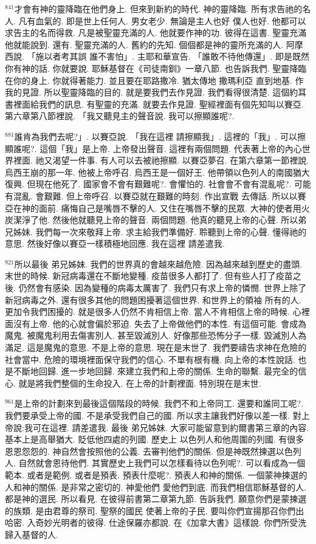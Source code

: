 \documentclass{book}
\begin{document}
$^{841}$才會有神的靈降臨在他們身上.
但來到新約的時代.
神的靈降臨.
所有求告祂的名人.
凡有血氣的.
即是世上任何人.
男女老少.
無論是主人也好 僕人也好.
他都可以求告主的名而得救.
凡是被聖靈充滿的人.
他就要作神的功.
彼得在這書.
聖靈充滿他就能說到.
還有.
聖靈充滿的人.
舊約的先知.
個個都是神的靈所充滿的人.
阿摩西說.
「施以者考其誤 誰不害怕」.
主耶和華宣告.
「誰敢不待他傳還」.
即是既然你有神的話.
你就要說.
耶穌基督在《司徒南釧》一章八節.
也告訴我們.
聖靈降臨在你的身上.
你就得著能力.
並且要在耶路撒冷.
猶太傳地 撒瑪利亞 直到地基.
作我的見證.
所以聖靈降臨的目的.
就是要我們去作見證.
我們看得很清楚.
這個約耳書裡面給我們的訊息.
有聖靈的充滿.
就要去作見證.
聖經裡面有個先知叫以賽亞.
第六章第八節裡說.
「我又聽見主的聲音說.
我可以擦顯誰呢?.

$^{881}$誰肯為我們去呢?」.
以賽亞說.
「我在這裡 請擦顯我」.
這裡的「我」.
可以擦顯誰呢?.
這個「我」是上帝.
上帝發出聲音.
這裡有兩個問題.
代表著上帝的內心世界裡面.
祂又渴望一件事.
有人可以去被祂擦顯.
以賽亞夢召.
在第六章第一節裡說.
烏西王崩的那一年.
他被上帝呼召.
烏西王是一個好王.
他帶領以色列人的南國猶大復興.
但現在他死了.
國家會不會有艱難呢?.
會懼怕的.
社會會不會有混亂呢?.
可能有混亂.
會艱難.
但上帝呼召.
以賽亞就在艱難的時刻.
作出宣戰 去傳話.
所以以賽亞在神的面前.
痛悔自己是嘴唇不擊的人.
又住在嘴唇不擊的民眾.
大神的使者用火炭潔淨了他.
然後他就聽見上帝的聲音.
兩個問題.
他真的聽見上帝的心聲.
所以弟兄姊妹.
我們每一次來敬拜上帝.
求主給我們準備好.
聆聽到上帝的心聲.
懂得祂的意思.
然後好像以賽亞一樣積極地回應.
我在這裡 請差遣我.

$^{921}$所以最後 弟兄姊妹.
我們的世界真的會越來越危險.
因為越來越到歷史的盡頭.
末世的時候.
新冠病毒還在不斷地變種.
疫苗很多人都打了.
但有些人打了疫苗之後.
仍然會有感染.
因為變種的病毒太厲害了.
我們只有求上帝的憐憫.
世界上除了新冠病毒之外.
還有很多其他的問題困擾著這個世界.
和世界上的領袖 所有的人.
更加令我們困擾的.
就是很多人仍然不肯相信上帝.
當人不肯相信上帝的時候.
心裡面沒有上帝.
他的心就會偏於邪迫.
失去了上帝做他們的本性.
有這個可能.
會成為魔鬼.
被魔鬼利用去傷害別人.
甚至毀滅別人.
好像那些恐怖分子一樣.
毀滅別人為滿足.
這是魔鬼的意思.
不是上帝的意思.
現在是末世了.
我們要禱告求神在危險的社會當中.
危險的環境裡面保守我們的信心.
不單有根有機.
向上帝的本性說話.
也是不斷地回歸.
進一步地回歸.
來建立我們和上帝的關係.
生命的聯繫.
最完全的信心.
就是將我們整個的生命投入.
在上帝的計劃裡面.
特別現在是末世.

$^{961}$是上帝的計劃來到最後這個階段的時候.
我們不和上帝同工.
還要和誰同工呢?.
我們要承受上帝的國.
不是承受我們自己的國.
所以求主讓我們好像以差一樣.
對上帝說:我可在這裡.
請差遣我.
最後 弟兄姊妹.
大家可能留意到約爾書第三章的內容.
基本上是高舉猶大.
貶低他四處的列國.
歷史上 以色列人和他周圍的列國.
有很多恩恩怨怨的.
神自然會按照他的公義.
去審判他們的關係.
但是神既然揀選以色列人.
自然就會恩待他們.
其實歷史上我們可以怎樣看待以色列呢?.
可以看成為一個範本.
或者是範例.
或者是預表.
預表什麼呢?.
預表人和神的關係.
一個蒙神揀選的人和神的關係.
是非常之密切的.
神愛他們 愛他們到底.
而我們相信耶穌基督的人.
都是神的選民.
所以看見.
在彼得前書第二章第九節.
告訴我們.
願意你們是蒙揀選的族類.
是由君尊的祭司.
聖祭的國民 使著上帝的子民.
要叫你們宣揚那召你們出哈密.
入奇妙光明者的彼得.
仕途保羅亦都說.
在《加拿大書》這樣說.
你們所受洗歸入基督的人.
\end{document}
